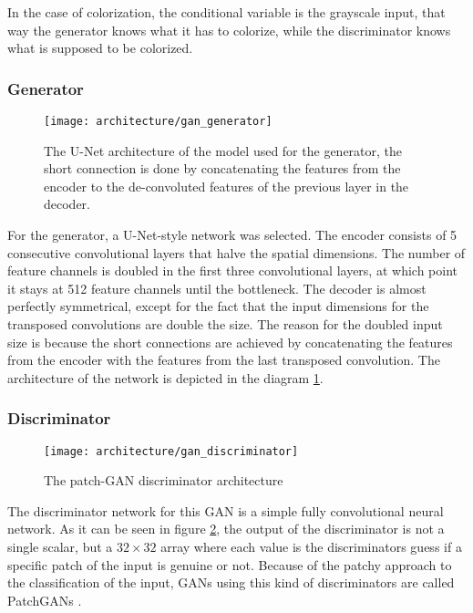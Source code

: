 In the case of colorization, the conditional variable is the grayscale input, 
that way the generator knows what it has to colorize, while the discriminator
knows what is supposed to be colorized.

\subsubsection{Generator}

\begin{figure}[!ht]
	\centering
	\texttt{[image: architecture/gan\_generator]}
    \caption{The U-Net architecture of the model used for the generator, the short connection
	is done by concatenating the features from the encoder to the de-convoluted features
	of the previous layer in the decoder.}
	\label{fig:architecture_gan}
\end{figure}

For the generator, a U-Net-style network was selected. The encoder consists
of 5 consecutive convolutional layers that halve the spatial dimensions. The 
number of feature channels is doubled in the first three convolutional layers, 
at which point it stays at 512 feature channels until the bottleneck. The decoder
is almost perfectly symmetrical, except for the fact that the input dimensions for 
the transposed convolutions are double the size. The reason for the doubled input
size is because the short connections are achieved by concatenating the features
from the encoder with the features from the last transposed convolution. The architecture
of the network is depicted in the diagram \ref{fig:architecture_gan}.

\subsubsection{Discriminator}

\begin{figure}[!ht]
	\centering
	\texttt{[image: architecture/gan\_discriminator]}
    \caption{The patch-GAN discriminator architecture}
	\label{fig:architecture_gan_discriminator}
\end{figure}

The discriminator network for this GAN is a simple fully convolutional neural network.
As it can be seen in figure \ref{fig:architecture_gan_discriminator}, the output
of the discriminator is not a single scalar, but a $32\times32$ array
where each value is the discriminators guess if a specific patch of the input is 
genuine or not. Because of the patchy approach to the classification of the input, 
GANs using this kind of discriminators are called PatchGANs \citep{isola2017pix2pix}.

